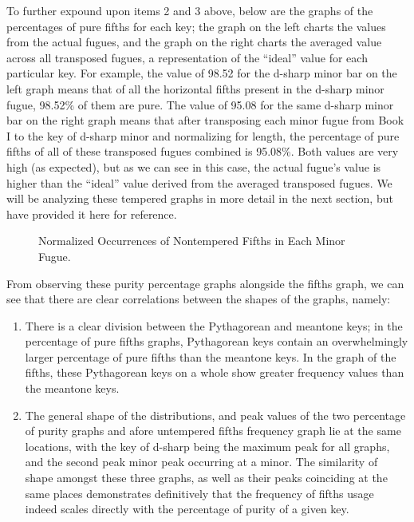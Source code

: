 To further expound upon items 2 and 3 above, below are the graphs of the
percentages of pure fifths for each key; the graph on the left charts
the values from the actual fugues, and the graph on the right charts the
averaged value across all transposed fugues, a representation of the
``ideal'' value for each particular key. For example, the value of 98.52
for the d-sharp minor bar on the left graph means that of all the
horizontal fifths present in the d-sharp minor fugue, 98.52\% of them
are pure. The value of 95.08 for the same d-sharp minor bar on the right
graph means that after transposing each minor fugue from Book I to the
key of d-sharp minor and normalizing for length, the percentage of pure
fifths of all of these transposed fugues combined is 95.08\%. Both
values are very high (as expected), but as we can see in this case, the
actual fugue's value is higher than the ``ideal'' value derived from the
averaged transposed fugues. We will be analyzing these tempered graphs
in more detail in the next section, but have provided it here for
reference.



\begin{figure}[H]
    \begin{center}
    \caption{Normalized Occurrences of Nontempered Fifths in Each Minor Fugue. }
    \end{center}
\end{figure}
    
    From observing these purity percentage graphs alongside the fifths
graph, we can see that there are clear correlations between the shapes
of the graphs, namely:

\begin{enumerate}
\def\labelenumi{\arabic{enumi}.}
\tightlist
\item
  There is a clear division between the Pythagorean and meantone keys;
  in the percentage of pure fifths graphs, Pythagorean keys contain an
  overwhelmingly larger percentage of pure fifths than the meantone
  keys. In the graph of the fifths, these Pythagorean keys on a whole
  show greater frequency values than the meantone keys.
\item
  The general shape of the distributions, and peak values of the two
  percentage of purity graphs and afore untempered fifths frequency
  graph lie at the same locations, with the key of d-sharp being the
  maximum peak for all graphs, and the second peak minor peak occurring
  at a minor. The similarity of shape amongst these three graphs, as
  well as their peaks coinciding at the same places demonstrates
  definitively that the frequency of fifths usage indeed scales directly
  with the percentage of purity of a given key.
\end{enumerate}

